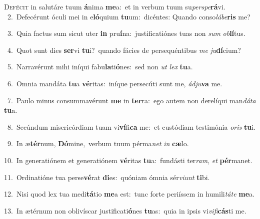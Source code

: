 \lettrine{\initial\textcolor{\initialcolor}{D}}{efécit} in salutáre tuum \textbf{á}\-nima \textbf{me}\-a:~\star et in verbum tuum su\-\textit{per}\-\textit{spe}\textbf{rá}vi.\\
{\numbfont\textcolor{\numbcolor}{~2.}}~Defecérunt óculi mei in e\-\textbf{ló}\-quium \textbf{tu}\-um:~\star dicéntes: Quando conso\-\textit{lá}\-\textit{be}\textbf{ris} me?\par
{\numbfont\textcolor{\numbcolor}{~3.}}~Quia factus sum sicut uter \textbf{in} pru\-\textbf{í}\-na:~\star justificatiónes tuas non \textit{sum} \textit{ob}\-\textbf{lí}tus.\par
{\numbfont\textcolor{\numbcolor}{~4.}}~Quot sunt dies \textbf{ser}\-vi \textbf{tu}\-i?~\star quando fácies de persequéntibus \textit{me} \textit{ju}\-\textbf{dí}cium?\par
{\numbfont\textcolor{\numbcolor}{~5.}}~Narravérunt mihi iníqui fabu\-\textbf{la}\-ti\-\textbf{ó}\-nes:~\star sed non \textit{ut} \textit{lex} \textbf{tu}\-a.\par
{\numbfont\textcolor{\numbcolor}{~6.}}~Omnia mandáta \textbf{tu}\-a \textbf{vé}\-ritas:~\star iníque persecúti sunt me, \textit{ád}\-\textit{ju}\textbf{va} me.\par
{\numbfont\textcolor{\numbcolor}{~7.}}~Paulo minus consummavérunt \textbf{me} in \textbf{ter}\-ra:~\star ego autem non derelíqui man\-\textit{dá}\-\textit{ta} \textbf{tu}\-a.\par
{\numbfont\textcolor{\numbcolor}{~8.}}~Secúndum misericórdiam tuam vi\-\textbf{ví}\-fi\textbf{ca} me:~\star et custódiam testimónia \textit{o}\-\textit{ris} \textbf{tu}\-i.\par
{\numbfont\textcolor{\numbcolor}{~9.}}~In æ\-\textbf{tér}\-num, \textbf{Dó}\-mine,~\star verbum tuum pérma\textit{net} \textit{in} \textbf{cæ}\-lo.\par
{\numbfont\textcolor{\numbcolor}{10.}}~In generatiónem et generatiónem \textbf{vé}\-ritas \textbf{tu}\-a:~\star fundásti ter\-\textit{ram}\-, \textit{et} \textbf{pér}\-manet.\par
{\numbfont\textcolor{\numbcolor}{11.}}~Ordinatióne tua perse\-\textbf{vé}\-rat \textbf{di}\-es:~\star quóniam ómnia sér\-\textit{vi}\-\textit{unt} \textbf{ti}\-bi.\par
{\numbfont\textcolor{\numbcolor}{12.}}~Nisi quod lex tua medi\-\textbf{tá}\-tio \textbf{me}\-a est:~\star tunc forte periíssem in humili\-\textit{tá}\-\textit{te} \textbf{me}\-a.\par
{\numbfont\textcolor{\numbcolor}{13.}}~In ætérnum non oblivíscar justificati\-\textbf{ó}\-nes \textbf{tu}\-as:~\star quia in ipsis vi\-\textit{vi}\-\textit{fi}\textbf{cás}ti me.\par

